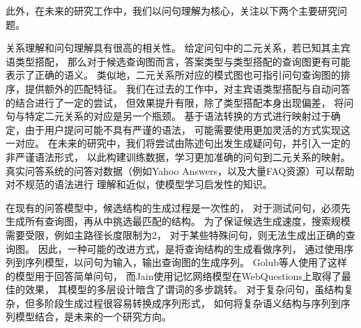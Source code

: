此外，在未来的研究工作中，我们以问句理解为核心，关注以下两个主要研究问题。

关系理解和问句理解具有很高的相关性。
给定问句中的二元关系，若已知其主宾语类型搭配，
那么对于候选查询图而言，答案类型与类型搭配的查询图更有可能表示了正确的语义。
类似地，二元关系所对应的模式图也可指引问句查询图的排序，提供额外的匹配特征。
我们在过去的工作中，对主宾语类型搭配与自动问答的结合进行了一定的尝试，
但效果提升有限，除了类型搭配本身出现偏差，
将问句与特定二元关系的对应是另一个瓶颈。
基于语法转换的方式进行映射过于确定，由于用户提问可能不具有严谨的语法，
可能需要使用更加灵活的方式实现这一对应。
在未来的研究中，我们将尝试由陈述句出发生成疑问句，并引入一定的非严谨语法形式，
以此构建训练数据，学习更加准确的问句到二元关系的映射。
真实问答系统的问答对数据（例如Yahoo Answers，以及大量FAQ资源）可以帮助对不规范的语法进行
理解和近似，使模型学习启发性的知识。

在现有的问答模型中，候选结构的生成过程是一次性的，
对于测试问句，必须先生成所有查询图，再从中挑选最匹配的结构。
为了保证候选生成速度，搜索规模需要受限，例如主路径长度限制为2，
对于某些特殊问句，则无法生成出正确的查询图。
因此，一种可能的改进方式，是将查询结构的生成看做序列，
通过使用序列到序列模型，以问句为输入，输出查询图的生成序列。
Golub等人\cite{golub2016character}使用了这样的模型用于回答简单问句，
而Jain\cite{jain2016question}使用记忆网络模型在WebQuestions上取得了最佳的效果，
其模型的多层设计暗含了谓词的多步跳转。
对于复杂问句，虽结构复杂，但多阶段生成过程很容易转换成序列形式，
如何将复杂语义结构与序列到序列模型结合，是未来的一个研究方向。







